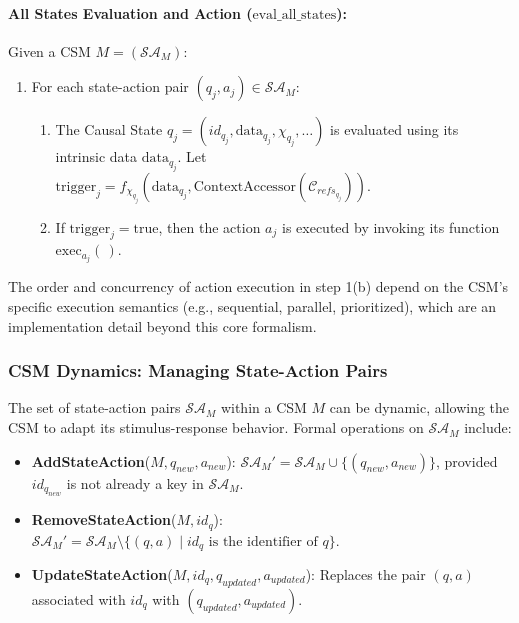     \paragraph{All States Evaluation and Action (\(\text{eval\_all\_states}\)):}
    Given a CSM \(M = (\mathcal{SA}_M)\):
    \begin{enumerate}
        \item For each state-action pair \((q_j, a_j) \in \mathcal{SA}_M\):
            \begin{enumerate}
                \item The Causal State \(q_j = (id_{q_j}, \text{data}_{q_j}, \chi_{q_j}, \dots)\) is evaluated using its intrinsic data \(\text{data}_{q_j}\).
                Let \( \text{trigger}_j = f_{\chi_{q_j}}(\text{data}_{q_j}, \text{ContextAccessor}(\mathcal{C}_{refs_{q_j}})) \).
                \item If \(\text{trigger}_j = \text{true}\), then the action \(a_j\) is executed by invoking its function \(\text{exec}_{a_j}(\,)\).
            \end{enumerate}
    \end{enumerate}
    The order and concurrency of action execution in step 1(b) depend on the CSM's specific execution semantics (e.g., sequential, parallel, prioritized), which are an implementation detail beyond this core formalism. 

    \subsubsection[CSM Dynamics: Managing State-Action Pairs]{CSM Dynamics: Managing State-Action Pairs}
    \label{ssec:csm_dynamics_formal_merged}

    The set of state-action pairs \(\mathcal{SA}_M\) within a CSM \(M\) can be dynamic, allowing the CSM to adapt its stimulus-response behavior. Formal operations on \(\mathcal{SA}_M\) include:
    \begin{itemize}
        \item \textbf{AddStateAction}(\(M, q_{new}, a_{new}\)): \( \mathcal{SA}_M' = \mathcal{SA}_M \cup \{(q_{new}, a_{new})\} \), provided \(id_{q_{new}}\) is not already a key in \(\mathcal{SA}_M\).
        \item \textbf{RemoveStateAction}(\(M, id_q\)): \( \mathcal{SA}_M' = \mathcal{SA}_M \setminus \{(q, a) \mid id_q \text{ is the identifier of } q \} \).
        \item \textbf{UpdateStateAction}(\(M, id_q, q_{updated}, a_{updated}\)): Replaces the pair \((q,a)\) associated with \(id_q\) with \((q_{updated}, a_{updated})\).
    \end{itemize}


